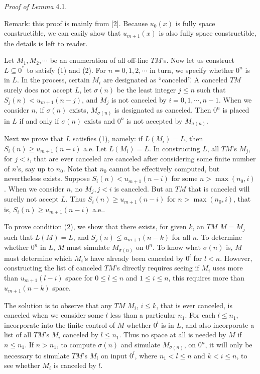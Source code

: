 {\it Proof of Lemma} 4.1.

Remark: this proof is mainly from [2].
Because $u_0(x)$ is fully space constructible, we can easily show 
that $u_{m+1}(x)$ is also fully space constructible, the details 
is left to reader.

Let $M_1,M_2,\cdots$ be an enumeration of
 all off-line $TM$'s.
Now let us construct $L\subseteq 0^*$ to satisfy (1) and (2). For
$n=0,1,2,\cdots$ in turn, we specify whether $0^n$ is in $L$. In
the process, certain $M_i$ are designated as ``canceled''. A 
canceled $TM$ surely does not accept $L$, let $\sigma(n)$ be the 
least integer $j\le n$ such that $S_j(n)<u_{m+1}(n-j)$, and $M_j$ 
is not canceled by $i=0,1,\cdots,n-1$. When we consider $n$, if 
$\sigma(n)$ exists, $M_{\sigma(n)}$ is designated as canceled. 
Then $0^n$ is placed in $L$ if and only if $\sigma(n)$ exists and
$0^n$ is not accepted by $M_{\sigma(n)}$.

Next we prove that $L$ satisfies (1), namely: if $L(M_i)=L$, then 
$S_i(n)\ge u_{m+1}(n-i)$ a.e. Let $L(M_i)=L$. In constructing 
$L$, all $TM$'s $M_j$, for $j<i$, that are ever canceled are 
canceled after considering some finite number of $n$'s, say up to 
$n_0$. Note that $n_0$ cannot be effectively computed, but 
nevertheless exists. Suppose $S_i(n)<u_{m+1}(n-i)$ for some 
$n>\max(n_0,i)$. When we consider $n$, no $M_j, j<i$ is canceled. 
But an $TM$ that is canceled will surelly not accept $L$. Thus 
$S_i(n)\ge u_{m+1}(n-i)$ for $n>\max(n_0,i)$, that is, $S_i(n)\ge 
u_{m+1}(n-i)$ a.e..

To prove condition (2), we show that there exists, for given $k$, 
an $TM$ $M=M_j$ such that $L(M)=L$, and $S_j(n)\le u_{m+1}(n-k)$
for all $n$. To determine whether $0^n$ in $L$, $M$ must simulate
$M_{\sigma(n)}$ on $0^n$. To know what $\sigma(n)$ is, $M$ must
determine which $M_i$'s have already been canceled by $0^l$ for
$l<n$. However, constructing the list of canceled $TM$'s directly 
requires seeing if $M_i$ uses more than $u_{m+1}(l-i)$ space for 
$0\le l\le n$ and $1\le i\le n$, this requires more than 
$u_{m+1}(n-k)$ space.

The solution is to observe that any $TM$ $M_i$, $i\le k$, that is 
ever canceled, is canceled when we consider some $l$ less than a 
particular $n_1$. For each $l\le n_1$, incorporate into the 
finite control of $M$ whether $0^l$ is in $L$, and also
incorporate a list of all $TM$'s $M_i$ canceled by $l\le n_1$. 
Thus no space at all is needed by $M$ if $n\le n_1$. If $n>n_1$, 
to compute $\sigma(n)$ and simulate $M_{\sigma(n)}$, on $0^n$, it
will only be necessary to simulate $TM$'s $M_i$ on input $0^l$,
where $n_1<l\le n$ and $k<i\le n$, to see whether $M_i$ is 
canceled by $l$.

